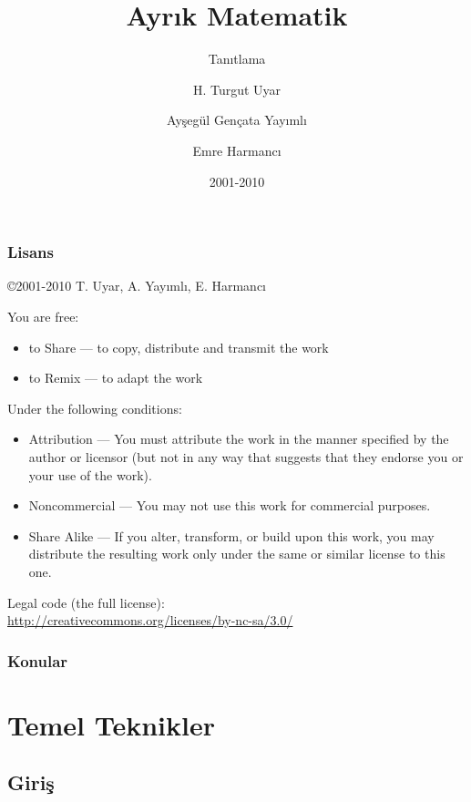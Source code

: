 \documentclass[dvipsnames]{beamer}
\title{Ayrık Matematik}
\subtitle{Tanıtlama}
\author{H. Turgut Uyar \and Ayşegül Gençata Yayımlı \and Emre Harmancı}
\date{2001-2010}
\theoremstyle{definition}
\theoremstyle{example}
\theoremstyle{plain}
\begin{document}
\begin{frame}
  \titlepage
\end{frame}

\begin{frame}
  \frametitle{Lisans}

  \hfill
  \copyright 2001-2010 T. Uyar, A. Yayımlı, E. Harmancı

  \vfill
  \begin{tiny}
    You are free:
    \begin{itemize}
      \item to Share — to copy, distribute and transmit the work
      \item to Remix — to adapt the work
    \end{itemize}

    Under the following conditions:
    \begin{itemize}
      \item Attribution — You must attribute the work in the manner specified by
        the author or licensor (but not in any way that suggests that they
        endorse you or your use of the work).

      \item Noncommercial — You may not use this work for commercial purposes.

      \item Share Alike — If you alter, transform, or build upon this work, you
        may distribute the resulting work only under the same or similar license
        to this one.
    \end{itemize}
  \end{tiny}

  \vfill
  Legal code (the full license):\\
  \url{http://creativecommons.org/licenses/by-nc-sa/3.0/}
\end{frame}

\begin{frame}
  \frametitle{Konular}
  \tableofcontents
\end{frame}

\section{Temel Teknikler}

\subsection{Giriş}
\end{document}
